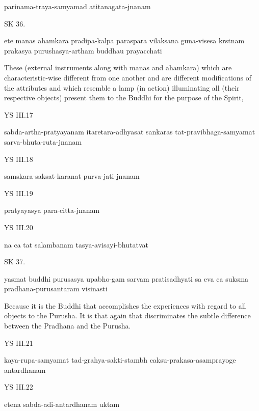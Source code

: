     parinama-traya-samyamad atitanagata-jnanam

SK 36.

ete manas ahamkara pradipa-kalpa paraspara vilaksana
guna-visesa krstnam prakasya purushasya-artham buddhau prayacchati

These (external instruments along with manas and ahamkara)
which are characteristic-wise different from one another
and are different modifications of the attributes
and which resemble a lamp (in action)
illuminating all (their respective objects)
present them to the Buddhi for the purpose of the Spirit,

YS III.17

    sabda-artha-pratyayanam itaretara-adhyasat sankaras
    tat-pravibhaga-samyamat sarva-bhuta-ruta-jnanam

YS III.18

    samskara-saksat-karanat purva-jati-jnanam

YS III.19

    pratyayasya para-citta-jnanam

YS III.20

    na ca tat salambanam tasya-avisayi-bhutatvat

SK 37.

yasmat buddhi purusasya upabho-gam sarvam pratisadhyati
sa eva ca suksma pradhana-purusantaram visinasti

Because it is the Buddhi that accomplishes the experiences
with regard to all objects to the Purusha.
It is that again that discriminates the subtle difference
between the Pradhana and the Purusha.

YS III.21

    kaya-rupa-samyamat tad-grahya-sakti-stambh
    caksu-prakasa-asamprayoge antardhanam

YS III.22

    etena sabda-adi-antardhanam uktam
